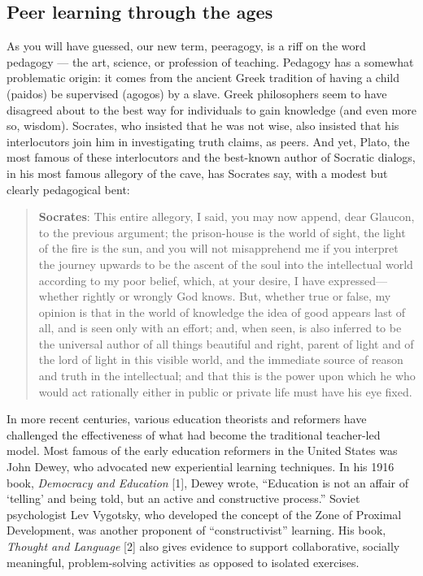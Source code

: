 \subsection{Peer learning through the ages}

As you will have guessed, our new term, peeragogy, is a riff on the word
pedagogy --- the art, science, or profession of teaching. Pedagogy has a
somewhat problematic origin: it comes from the ancient Greek tradition
of having a child (paidos) be supervised (agogos) by a slave. Greek
philosophers seem to have disagreed about to the best way for
individuals to gain knowledge (and even more so, wisdom). Socrates, who
insisted that he was not wise, also insisted that his interlocutors join
him in investigating truth claims, as peers. And yet, Plato, the most
famous of these interlocutors and the best-known author of Socratic
dialogs, in his most famous allegory of the cave, has Socrates say, with
a modest but clearly pedagogical bent:

\begin{quote}
\textbf{Socrates}: This entire allegory, I said, you may now append,
dear Glaucon, to the previous argument; the prison-house is the world of
sight, the light of the fire is the sun, and you will not misapprehend
me if you interpret the journey upwards to be the ascent of the soul
into the intellectual world according to my poor belief, which, at your
desire, I have expressed---whether rightly or wrongly God knows. But,
whether true or false, my opinion is that in the world of knowledge the
idea of good appears last of all, and is seen only with an effort; and,
when seen, is also inferred to be the universal author of all things
beautiful and right, parent of light and of the lord of light in this
visible world, and the immediate source of reason and truth in the
intellectual; and that this is the power upon which he who would act
rationally either in public or private life must have his eye fixed.
\end{quote}
In more recent centuries, various education theorists and reformers have
challenged the effectiveness of what had become the traditional
teacher-led model. Most famous of the early education reformers in the
United States was John Dewey, who advocated new experiential learning
techniques. In his 1916 book, \emph{Democracy and Education} {[}1{]},
Dewey wrote, ``Education is not an affair of `telling' and being told,
but an active and constructive process.'' Soviet psychologist Lev
Vygotsky, who developed the concept of the Zone of Proximal Development,
was another proponent of ``constructivist'' learning. His book,
\emph{Thought and Language} {[}2{]} also gives evidence to support
collaborative, socially meaningful, problem-solving activities as
opposed to isolated exercises.

